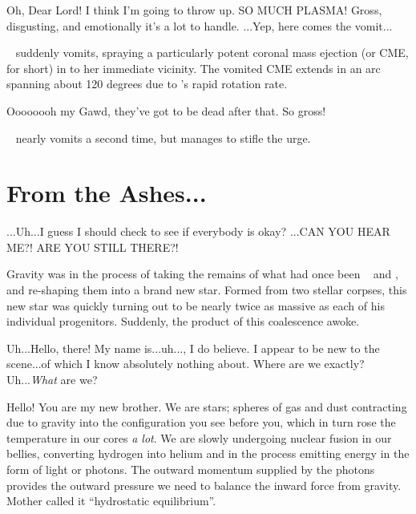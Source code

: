 \documentclass[main.tex]{subfiles}
\begin{document}
\par \Celaeno Oh, Dear Lord!  I think I'm going to throw up.  SO MUCH PLASMA!  Gross, disgusting, and emotionally it's a lot to handle. ...Yep, here comes the vomit...

\par \nar \rmcelaeno~ suddenly vomits, spraying a particularly potent coronal mass ejection (or CME, for short) in to her immediate vicinity.  The vomited CME extends in an arc spanning about 120 degrees due to \rmcelaeno's rapid rotation rate.

\par \Celaeno Oooooooh my Gawd, they've got to be dead after that.  So gross!  

\par \nar \rmcelaeno~ nearly vomits a second time, but manages to stifle the urge.

\section{From the Ashes...} 

\par \Celaeno ...Uh...I guess I should check to see if everybody is okay? ...CAN YOU HEAR ME?!  ARE YOU STILL THERE?! 

\par \nar Gravity was in the process of taking the remains of what had once been \rmtaygete~ and \rmalcyone, and re-shaping them into a brand new star.  Formed from two stellar corpses, this new star was quickly turning out to be nearly twice as massive as each of his individual progenitors.  Suddenly, the product of this coalescence awoke.


\par \Lacedaemon Uh...Hello, there!  My name is...uh...\rmlacedaemon, I do believe.  I appear to be new to the scene...of which I know absolutely nothing about.  Where are we exactly?  Uh...\textit{What} are we?

\par \Celaeno Hello!  You are my new brother.  We are stars; spheres of gas and dust contracting due to gravity into the configuration you see before you, which in turn rose the temperature in our cores \textit{a lot}.  We are slowly undergoing nuclear fusion in our bellies, converting hydrogen into helium and in the process emitting energy in the form of light or photons.  The outward momentum supplied by the photons provides the outward pressure we need to balance the inward force from gravity.  Mother called it ``hydrostatic equilibrium''.
\end{document}
